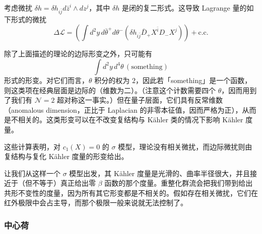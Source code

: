 
考虑微扰 $\delta h=\delta h_{i\bar j}d\bar z^i\wedge dz^j$，其中 $\delta h$ 是闭的复二形式。这导致 Lagrange 量的如下形式的微扰
\[
\Delta\mathcal{L}=\left(\int d^2y\,d\bar\theta^+d\theta^-(\delta h_{i\bar j}\bar D_+X^{\bar i}D_-X^j)\right)+\text{c.c.}
\]

除了上面描述的理论的边际形变之外，只可能有
\[
\int d^2y\,d^4\theta\,(\text{something})
\]
形式的形变。对它们而言，$\theta$ 积分的权为 $2$，因此若「something」是一个函数，则这类项在经典层面是边际的（维数为二）。（注意这个计数需要四个 $\theta$，因而用到了我们有 $\mathcal{N}=2$ 超对称这一事实。）但在量子层面，它们具有反常维数（anomalous dimension，正比于 Laplacian 的非零本征值，因而严格为正），从而是不相关的。这类形变可以在不改变复结构与 Kähler 类的情况下影响 Kähler 度量。

这些计算表明，对 $c_1(X)=0$ 的 $\sigma$ 模型，理论没有相关微扰，而边际微扰则由复结构与复化 Kähler 度量的形变给出。

让我们从这样一个 $\sigma$ 模型出发，其 Kähler 度量是光滑的、曲率半径很大，并且接近于（但不等于）真正给出零 $\beta$ 函数的那个度量。重整化群流会把我们带到给出共形不变性的度量，因为所有其它形变都是不相关的。假如存在相关微扰，它们在红外极限中会占主导，而那个极限一般来说就无法控制了。

\subsubsection{中心荷}

